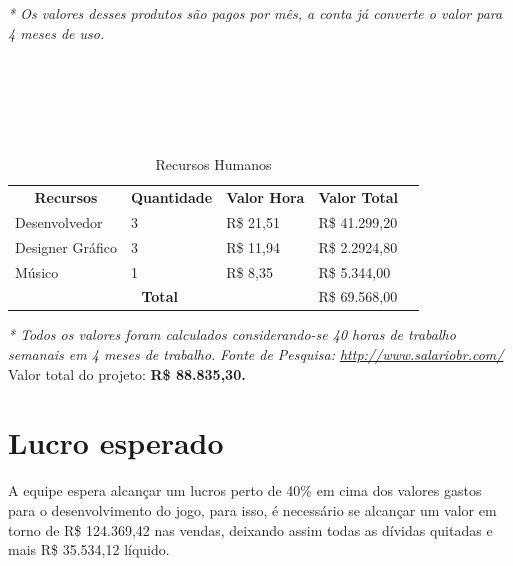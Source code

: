 \documentclass[a4paper,11pt]{article}
\begin{document}
\textit{* Os valores desses produtos são pagos por mês, a conta já converte o valor para 4 meses de uso.}
\\
\\
\\
\\
\\
\\

\begin{table}[h]
\begin{tabular}{|l|l|l|l|l}
\cline{1-4}
\multicolumn{1}{|c|}{\textbf{Recursos}} & \multicolumn{1}{c|}{\textbf{Quantidade}} & \multicolumn{1}{c|}{\textbf{Valor Hora}} & \multicolumn{1}{c|}{\textbf{Valor Total}} &  \\ \cline{1-4}
Desenvolvedor                           & 3                                        & R\$ 21,51                                & R\$ 41.299,20                             &  \\ \cline{1-4}
Designer Gráfico                        & 3                                        & R\$ 11,94                                & R\$ 2.2924,80                             &  \\ \cline{1-4}
Músico                                  & 1                                        & R\$ 8,35                                 & R\$ 5.344,00                              &  \\ \cline{1-4}
\multicolumn{3}{|c|}{\textbf{Total}}                                                                                          & R\$ 69.568,00                             &  \\ \cline{1-4}
\end{tabular}
\caption {Recursos Humanos}
\end{table}

\textit{* Todos os valores foram calculados considerando-se 40 horas de trabalho semanais em 4 meses de trabalho.}
\textit{Fonte de Pesquisa: \url{http://www.salariobr.com/}}
\\

Valor total do projeto: {\textbf{R\$ 88.835,30.}}

\section{Lucro esperado}

A equipe espera alcançar um lucros perto de 40\% em cima dos valores gastos para o desenvolvimento do jogo, para isso, é necessário se alcançar um valor em torno de R\$ 124.369,42 nas vendas, deixando assim todas as dívidas quitadas e mais R\$ 35.534,12 líquido.
\end{document}

